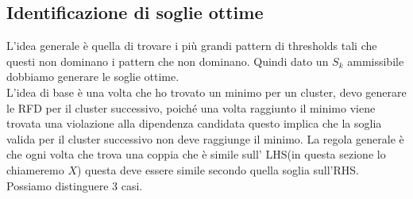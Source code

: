 \subsection{Identificazione di soglie ottime}
L'idea generale è quella di trovare i più grandi pattern di thresholds tali che questi non dominano i pattern che non dominano. Quindi dato un $S_{k}$ ammissibile dobbiamo generare le soglie ottime.\\
L'idea di base è una volta che ho trovato un minimo per un cluster, devo generare le RFD per il cluster successivo, poiché una volta raggiunto il minimo viene trovata una violazione alla dipendenza candidata questo implica che la soglia valida per il cluster successivo non deve raggiunge il minimo. La regola generale è che ogni volta che trova una coppia che è simile sull' LHS(in questa sezione lo chiameremo $X$) questa deve essere simile secondo quella soglia sull'RHS. Possiamo distinguere 3 casi.
